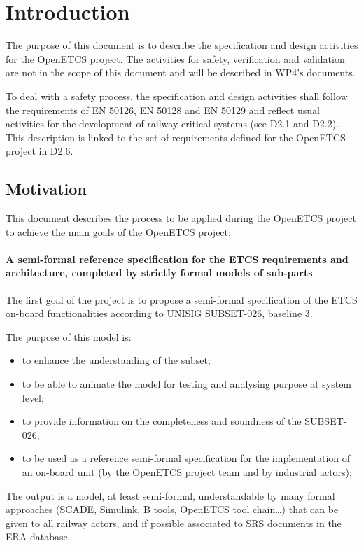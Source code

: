 \section{Introduction}

The purpose of this document is to describe the specification and design activities for the OpenETCS project. The activities for safety, verification and validation are not in the scope of this document and will be described in WP4's documents.

To deal with a safety process, the specification and design activities shall follow the requirements of EN 50126, EN 50128 and EN 50129 and reflect usual activities for the development of railway critical systems (see D2.1  and D2.2).
This description is linked to the set of requirements defined for the OpenETCS project in D2.6.

\subsection{Motivation}

This document describes the process to  be applied  during the OpenETCS project to achieve the main goals of the OpenETCS project:

\paragraph{A semi-formal reference specification for the ETCS requirements and architecture, completed by strictly formal  models of sub-parts}
The first goal of the project is to propose a semi-formal specification of the ETCS on-board functionalities according to  UNISIG SUBSET-026, baseline 3.

The purpose of this model is:
\begin{itemize}
\item to enhance the understanding of the subset;
\item to be able to animate the model for testing and analysing purpose at system level;
\item to provide information on the completeness and soundness of the SUBSET-026;
\item to be used as a reference semi-formal specification for the implementation of an on-board unit
(by the OpenETCS project team and by industrial actors);
\end{itemize}

The output is a model, at least semi-formal, understandable by many formal approaches (SCADE,
Simulink, B tools, OpenETCS tool chain…) that can be given to all railway actors, and
if possible associated to SRS documents in the ERA database.

